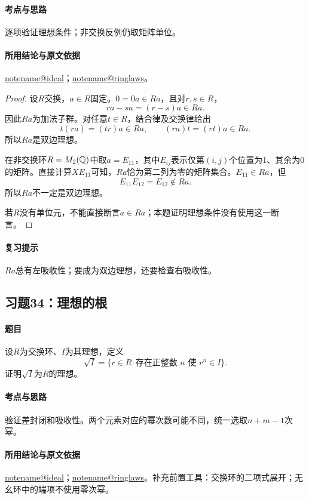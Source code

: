 \documentclass[UTF8,a4paper,11pt,fontset=windows]{ctexart}
\makeatletter
\newcommand{\noteref}[1]{\hyperref[note:#1]{\csname notename@#1\endcsname}}
\newcommand{\exref}[2]{\hyperref[ex:#1:#2]{第#1章习题#2}}
\makeatother
\begin{document}
\paragraph{考点与思路}
逐项验证理想条件；非交换反例仍取矩阵单位。

\paragraph{所用结论与原文依据}
\noteref{ideal}；\noteref{ringlaws}。


\begin{proof}
设$R$交换，$a\in R$固定。$0=0a\in Ra$，且对$r,s\in R$，
\[
ra-sa=(r-s)a\in Ra.
\]
因此$Ra$为加法子群。对任意$t\in R$，结合律及交换律给出
\[
t(ra)=(tr)a\in Ra,\qquad (ra)t=(rt)a\in Ra.
\]
所以$Ra$是双边理想。

在非交换环$R=M_2(\mathbb Q)$中取$a=E_{11}$，其中$E_{ij}$表示仅第$(i,j)$个位置为1、其余为0的矩阵。直接计算$XE_{11}$可知，$Ra$恰为第二列为零的矩阵集合。$E_{11}\in Ra$，但
\[
E_{11}E_{12}=E_{12}\notin Ra.
\]
所以$Ra$不一定是双边理想。

若$R$没有单位元，不能直接断言$a\in Ra$；本题证明理想条件没有使用这一断言。
\end{proof}

\paragraph{复习提示}
$Ra$总有左吸收性；要成为双边理想，还要检查右吸收性。


\subsection{习题34：\texorpdfstring{理想的根}{理想的根}}
\label{ex:1:34}

\paragraph{题目}
设$R$为交换环、$I$为其理想，定义
\[
\sqrt I=\{r\in R:\text{存在正整数 }n\text{ 使 }r^n\in I\}.
\]
证明$\sqrt I$为$R$的理想。

\paragraph{考点与思路}
验证差封闭和吸收性。两个元素对应的幂次数可能不同，统一选取$n+m-1$次幂。

\paragraph{所用结论与原文依据}
\noteref{ideal}；\noteref{ringlaws}。补充前置工具：交换环的二项式展开；无幺环中的端项不使用零次幂。
\end{document}
